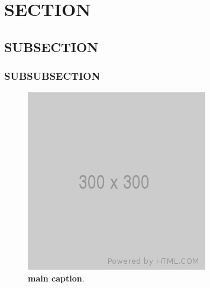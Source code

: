 \documentclass[12pt, lettersize]{article}
\begin{document}

\newpage



\newpage

\section{SECTION}
\lipsum[1]

\subsection{SUBSECTION}
\lipsum[1-2]

\subsubsection{SUBSUBSECTION}
\lipsum[1-3]

\begin{figure}[H]
  \centering
    \includegraphics[scale=1]{placeholder_300.png}
    \caption[main caption]
    {
      \textbf{main caption}\protect\footnotemark.
      \blindtext
    }
    \label{\figname{1}{1}}
\end{figure}
\footnotetext{\blindtext}
\end{document}

